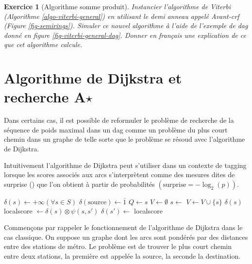 \documentclass[11pt,openany]{book}
\newtheorem{exo}{Exercice}[chapter]
\newcommand{\ac}[1]{{\sc #1}} %
\begin{document}
\begin{exo}[Algorithme somme produit]
Instancier l'algorithme de Viterbi (Algorithme
\ref{algo-viterbi-general}) en utilisant le demi anneau 
appelé Avant-\ac{crf} (Figure \ref{fig-semirings}). Simuler ce nouvel
algorithme à l'aide de l'exemple  de \ac{dag} donné en figure
\ref{fig-viterbi-general-dag}. Donner en français une explication de
ce que cet algorithme calcule. 
\end{exo}


\section{Algorithme de Dijkstra et recherche A$\star$}

Dans certains cas, il est possible de reformuler le problème de recherche de la séquence
de poids maximal dans un \ac{dag} comme un problème du plus court
chemin dans un graphe de telle sorte que le problème se résoud avec
l'algorithme de Dijkstra.
 
Intuitivement l'algorithme de Dijkstra peut s'utiliser dans un
contexte de tagging lorsque les scores associés aux arcs
s'interprètent comme des mesures dites de surprise (\cite{hale}) que l'on obtient à partir
de probabilités $(\text{surprise} =  -\log_2(p))$.


\begin{algorithm}[htbp]
\begin{algorithmic}
\State $ \delta(s) \gets +\infty$\qquad$(\forall s \in S)$ 
\State $ \delta(\text{source}) \gets \bar{1}$ 
\State $Q \gets s$
\State $V \gets \emptyset$
    \State $s \gets$  
    \State $V \gets V \cup \{s\}$
        \State\Return $\delta(s)$
    \EndIf
        \State localscore $\gets \delta(s) \otimes \psi(s,s')$
              \State $\delta(s') \gets$ localscore
              \State {}
        \EndIf
       \EndIf
    \EndFor
\EndWhile
\EndFunction
\end{algorithmic}
\caption{\label{algo-dijkstra-general}Algorithme de Dijkstra}
\end{algorithm}


Commençons par rappeler le fonctionnement de l'algorithme de Dijkstra
dans le cas classique. On suppose un graphe dont les arcs sont
pondérés par des distances entre des stations de métro. Le problème est de trouver le
plus court chemin entre deux stations, la première est appelée la
source, la seconde la destination.
\end{document}
